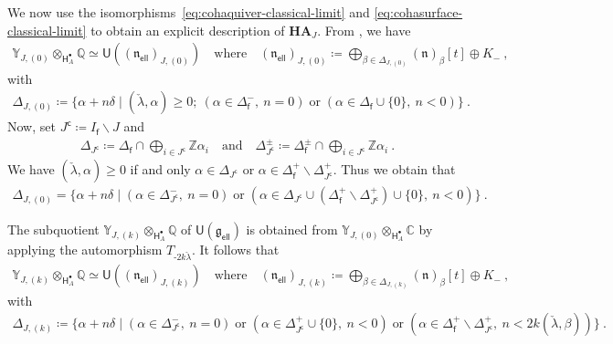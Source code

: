 \documentclass[reqno,a4paper]{amsart}
\newcommand{\C}{\mathbb{C}}
\newcommand{\Q}{\mathbb{Q}}
\newcommand{\Y}{\mathbb{Y}}
\newcommand{\Z}{\mathbb{Z}}
\newcommand{\sfH}{\mathsf{H}}
\newcommand{\sfU}{\mathsf{U}}
\newcommand{\sff}{\mathsf{f}}
\newcommand{\frakn}{\mathfrak{n}}
\newcommand{\Llambda}{{\check{\lambda}}}
\newcommand{\Jcomp}{{J^\mathsf{c}}}
\newcommand{\frakgell}{\mathfrak{g}_{\mathsf{ell}}}
\newcommand{\fraknell}{\mathfrak{n}_{\mathsf{ell}}}
\newcommand{\coha}{\mathbf{HA}}
\theoremstyle{basic-theorem}
\numberwithin{equation}{section}
\begin{document}
We now use the isomorphisms~\eqref{eq:cohaquiver-classical-limit} and \eqref{eq:cohasurface-classical-limit} to obtain an explicit description of $\coha_J$. From \cite[\S\ref*{COHA-Yangian-sec:quotients-Yangians}]{DPSSV-3}, we have
\begin{align}
	\Y_{J, (0)}\otimes_{\sfH^\bullet_A} \Q \simeq \sfU((\fraknell)_{J,(0)})\quad \text{where} \quad (\fraknell)_{J,(0)}\coloneqq\bigoplus_{\beta \in \Delta_{J, (0)}} (\frakn)_{\beta}[t] \oplus K_-\ ,
\end{align}
with
\begin{align}
	\Delta_{J, (0)}\coloneqq \Big\{\alpha +n\delta \; \Big\vert\; (\Llambda, \alpha)\geq 0;\ (\alpha\in \Delta^-_\sff,\ n=0) \;\text{or}\; (\alpha \in \Delta_\sff \cup\{0\},\ n<0) \Big\}\ .
\end{align}
Now, set $\Jcomp\coloneqq I_\sff\smallsetminus J$ and
\begin{align}
	\Delta_{\Jcomp}\coloneqq \Delta_\sff \cap \bigoplus_{i\in \Jcomp} \Z \alpha_i\quad \text{and} \quad \Delta_{\Jcomp}^\pm\coloneqq \Delta_\sff^\pm \cap \bigoplus_{i\in \Jcomp} \Z \alpha_i\ .
\end{align}
We have $(\Llambda,\alpha) \geq 0$ if and only $\alpha \in \Delta_{\Jcomp}$ or $\alpha \in \Delta_\sff^+ \smallsetminus \Delta^+_{\Jcomp}$. Thus we obtain that
\begin{align}
	\Delta_{J, (0)} = \Big\{\alpha +n\delta \; \Big\vert\; (\alpha\in \Delta^-_{\Jcomp},\  n=0)\; \text{or}\; (\alpha \in \Delta_{\Jcomp}\cup (\Delta^+_{\sff} \smallsetminus \Delta^+_{\Jcomp}) \cup \{0\},\  n<0) \Big\} \ .
\end{align}

The subquotient $\Y_{J, (k)}\otimes_{\sfH^\bullet_A} \Q$ of $\sfU(\frakgell)$ is obtained from $\Y_{J, (0)}\otimes_{\sfH^\bullet_A} \C$ by applying the automorphism $T_{\textrm{-}2k\Llambda}$. It follows that
\begin{align}
	\Y_{J, (k)}\otimes_{\sfH^\bullet_A} \Q \simeq \sfU((\fraknell)_{J,(k)}) \quad \text{where} \quad (\fraknell)_{J,(k)}\coloneqq \bigoplus_{\beta \in \Delta_{J, (k)}} (\frakn)_{\beta}[t] \oplus K_-\ ,
\end{align}
with
\begin{multline}
	\Delta_{J, (k)}\coloneqq \Big\{\alpha +n\delta \; \Big\vert\; (\alpha\in \Delta^-_{\Jcomp},\ n=0) \;\text{or}\;(\alpha\in \Delta^+_{\Jcomp}\cup \{0\},\ n<0)\;\text{or}\;(\alpha\in \Delta^+_\sff \smallsetminus \Delta^+_{\Jcomp},\  n<2k(\Llambda, \beta))\Big\} \ .
\end{multline}
\end{document}
